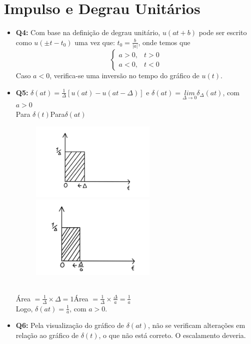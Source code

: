 \documentclass[a4paper, 12pt]{article}
\begin{document}
\section{Impulso e Degrau Unitários}
\begin{itemize}
    \item \textbf{Q4:} Com base na definição de degrau unitário, $u(at+b)$ pode ser escrito como $u(\pm t - t_0)$ uma vez que: $t_0 = \frac{b}{|a|}$, onde temos que
    \[ \begin{cases} 
      a > 0, & t > 0\\
      a < 0, & t < 0
    \end{cases} \]
    Caso $a < 0$, verifica-se uma inversão no tempo do gráfico de $u(t)$.
    \newpage
    \item \textbf{Q5:} $\delta(at) = \frac{1}{\Delta}[u(at) - u(at - \Delta)]$ e $\delta(at) = \underset{{\Delta\to0}}{lim}\delta_\Delta(at)$, com $a > 0$\vspace{15px}\\
    Para $\delta(t)$\hspace{150px}Para$\delta(at)$\\
    \begin{figure}[!ht]
        \includegraphics[width=6cm]{images/Graf1.png}
        \hspace{10px}
        \includegraphics[width=6cm]{images/Graf2.png}
    \end{figure}\\
    Área $ = \frac{1}{\Delta}\times\Delta = 1$\hspace{100px}Área $= \frac{1}{\Delta} \times \frac{\Delta}{a} = \frac{1}{a}$\vspace{15px}\\
    Logo, $\delta(at) = \frac{1}{a}$, com $a > 0$.\vspace{5px}
    \item \textbf{Q6:} Pela visualização do gráfico de $\delta(at)$, não se verificam alterações em relação ao gráfico de $\delta(t)$, o que não está correto. O escalamento deveria.
\end{itemize}
\newpage
\end{document}
